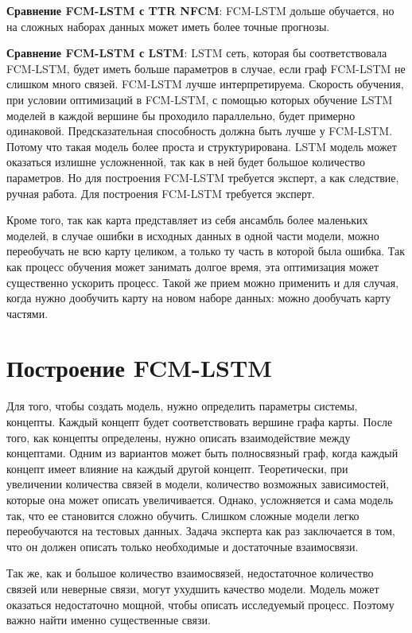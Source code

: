 \textbf{Сравнение FCM-LSTM с TTR NFCM}:
FCM-LSTM дольше обучается, но на сложных наборах данных
может иметь более точные прогнозы.

\textbf{Сравнение FCM-LSTM с LSTM}:
LSTM сеть, которая бы соответствовала FCM-LSTM, будет иметь
больше параметров в случае, если граф FCM-LSTM не слишком
много связей. FCM-LSTM лучше интерпретируема.
Скорость обучения, при условии оптимизаций в FCM-LSTM, с
помощью которых обучение LSTM моделей в каждой вершине бы проходило
параллельно, будет примерно одинаковой.
Предсказательная способность должна быть лучше у FCM-LSTM.
Потому что такая модель более проста и структурирована.
LSTM модель может оказаться излишне усложненной, так как в ней будет
большое количество параметров.
Но для построения FCM-LSTM требуется эксперт, а как следствие,
ручная работа.
Для построения FCM-LSTM требуется эксперт.

Кроме того, так как карта представляет из себя ансамбль
более маленьких моделей, в случае ошибки в исходных данных
в одной части модели, можно переобучать не всю карту целиком,
а только ту часть в которой была ошибка. Так как процесс обучения
может занимать долгое время, эта оптимизация может существенно ускорить процесс.
Такой же прием можно применить и для случая, когда нужно дообучить карту на
новом наборе данных: можно дообучать карту частями.

\section{Построение FCM-LSTM}

Для того, чтобы создать модель, нужно определить параметры системы, концепты.
Каждый концепт будет соответствовать вершине графа карты.
После того, как концепты определены, нужно описать взаимодействие между концептами.
Одним из вариантов может быть полносвязный граф, когда каждый концепт имеет
влияние на каждый другой концепт. Теоретически, при увеличении количества
связей в модели, количество возможных зависимостей, которые она может описать
увеличивается. Однако, усложняется и сама модель так, что ее становится сложно обучить.
Слишком сложные модели легко переобучаются на тестовых данных.
Задача эксперта как раз заключается в том, что он должен
описать только необходимые и достаточные взаимосвязи.

Так же, как и большое количество взаимосвязей,
недостаточное количество связей или неверные связи, могут ухудшить
качество модели. Модель может оказаться недостаточно мощной, чтобы описать
исследуемый процесс. Поэтому важно найти именно существенные связи.

